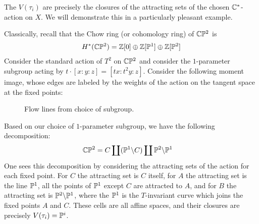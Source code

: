 The $V(\tau_i)$ are precisely the closures of the attracting sets
of the chosen $\C^*$-action on $X$. We will demonstrate this in a particularly
pleasant example.
\begin{example}
	Classically, recall that the Chow ring (or cohomology ring) of
	$\C\P^2$ is \begin{align*}
		H^*(\C\P^2) = \Z[0] \oplus \Z[\P^1] \oplus \Z[\P^2]
	\end{align*} Consider the standard action of $T^2$ on $\C\P^2$
	and consider the $1$-parameter subgroup acting by $t\cdot[x:y:z] = [tx:t^2y:z]$.
	Consider the following moment image, whose
	edges are labeled by the weights of the action on the tangent space at the fixed points:

	\begin{figure}[H]
		\caption{Flow lines from choice of subgroup.}
		\label{fig:attracting-sets}
	\end{figure}
	Based on our choice of $1$-parameter subgroup, we have the following decomposition: \begin{align*}
		\C\P^2 & = C \coprod (\P^1 \backslash C) \coprod \P^2 \backslash \P^1
	\end{align*} One sees this decomposition by considering
	the attracting sets of the action for each fixed point. For $C$ the
	attracting set is $C$ itself, for $A$ the attracting set is the line $\P^1$,
	all the points of $\P^1$ except $C$ are attracted to $A$, and for $B$ the attracting
	set is $\P^2 \backslash \P^1$, where the $\P^1$ is the $T$-invariant curve which joins the fixed points $A$ and $C$. These cells are all affine spaces, and their
	closures are precisely $V(\tau_i) = \P^i$.
\end{example}
